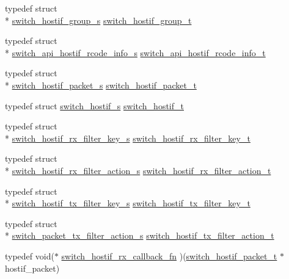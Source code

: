 \begin{DoxyCompactItemize}
\item 
typedef struct \\*
\hyperlink{structswitch__hostif__group__s}{switch\+\_\+hostif\+\_\+group\+\_\+s} \hyperlink{group__HostInterface_gaaacd1815b505c965d68a7604f211d907}{switch\+\_\+hostif\+\_\+group\+\_\+t}
\item 
typedef struct \\*
\hyperlink{structswitch__api__hostif__rcode__info__s}{switch\+\_\+api\+\_\+hostif\+\_\+rcode\+\_\+info\+\_\+s} \hyperlink{group__HostInterface_gad572618a94aec43492d76730093e105f}{switch\+\_\+api\+\_\+hostif\+\_\+rcode\+\_\+info\+\_\+t}
\item 
typedef struct \\*
\hyperlink{structswitch__hostif__packet__s}{switch\+\_\+hostif\+\_\+packet\+\_\+s} \hyperlink{group__HostInterface_gacf3b5146e7fbf5d3726cbd9ba7cd6636}{switch\+\_\+hostif\+\_\+packet\+\_\+t}
\item 
typedef struct \hyperlink{structswitch__hostif__s}{switch\+\_\+hostif\+\_\+s} \hyperlink{group__HostInterface_ga3cd1d0c163caae841da0f87a23e5caf7}{switch\+\_\+hostif\+\_\+t}
\item 
typedef struct \\*
\hyperlink{structswitch__hostif__rx__filter__key__s}{switch\+\_\+hostif\+\_\+rx\+\_\+filter\+\_\+key\+\_\+s} \hyperlink{group__HostInterface_ga10a6365e0fb5dfe061e099c366131070}{switch\+\_\+hostif\+\_\+rx\+\_\+filter\+\_\+key\+\_\+t}
\item 
typedef struct \\*
\hyperlink{structswitch__hostif__rx__filter__action__s}{switch\+\_\+hostif\+\_\+rx\+\_\+filter\+\_\+action\+\_\+s} \hyperlink{group__HostInterface_gae246494c29a7bbbbec6d51554108d01b}{switch\+\_\+hostif\+\_\+rx\+\_\+filter\+\_\+action\+\_\+t}
\item 
typedef struct \\*
\hyperlink{structswitch__hostif__tx__filter__key__s}{switch\+\_\+hostif\+\_\+tx\+\_\+filter\+\_\+key\+\_\+s} \hyperlink{group__HostInterface_gabae602b7028818087fe7f1c9b8d02c34}{switch\+\_\+hostif\+\_\+tx\+\_\+filter\+\_\+key\+\_\+t}
\item 
typedef struct \\*
\hyperlink{structswitch__packet__tx__filter__action__s}{switch\+\_\+packet\+\_\+tx\+\_\+filter\+\_\+action\+\_\+s} \hyperlink{group__HostInterface_ga294bb3f6e4fd80c02ca1c80acf11422c}{switch\+\_\+hostif\+\_\+tx\+\_\+filter\+\_\+action\+\_\+t}
\item 
typedef void($\ast$ \hyperlink{group__HostInterface_gaeb0d6cedcbaf8794cc964f72383bc404}{switch\+\_\+hostif\+\_\+rx\+\_\+callback\+\_\+fn} )(\hyperlink{group__HostInterface_gacf3b5146e7fbf5d3726cbd9ba7cd6636}{switch\+\_\+hostif\+\_\+packet\+\_\+t} $\ast$hostif\+\_\+packet)
\end{DoxyCompactItemize}
